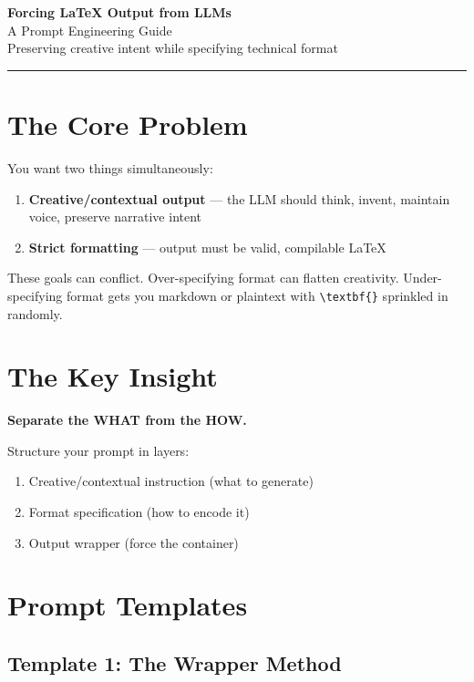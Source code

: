 \documentclass[11pt,letterpaper]{article}
\begin{document}
\begin{center}
{\LARGE\textbf{Forcing LaTeX Output from LLMs}}\\[0.5em]
{\large A Prompt Engineering Guide}\\[0.3em]
{\small Preserving creative intent while specifying technical format}
\end{center}

\vspace{1em}
\hrule
\vspace{1em}

\section{The Core Problem}

You want two things simultaneously:

\begin{enumerate}
    \item \textbf{Creative/contextual output} --- the LLM should think, invent, maintain voice, preserve narrative intent
    \item \textbf{Strict formatting} --- output must be valid, compilable LaTeX
\end{enumerate}

These goals can conflict. Over-specifying format can flatten creativity. Under-specifying format gets you markdown or plaintext with \verb|\textbf{}| sprinkled in randomly.

\section{The Key Insight}

\textbf{Separate the WHAT from the HOW.}

Structure your prompt in layers:

\begin{enumerate}
    \item Creative/contextual instruction (what to generate)
    \item Format specification (how to encode it)
    \item Output wrapper (force the container)
\end{enumerate}

\section{Prompt Templates}

\subsection{Template 1: The Wrapper Method}
\end{document}
